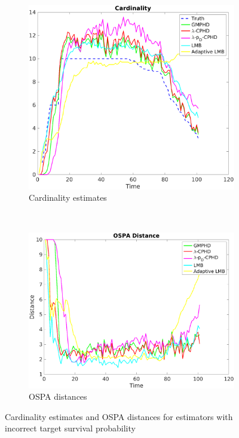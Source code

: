 \documentclass{article}
\begin{document}
\begin{figure}[H]
  \centering
  \begin{subfigure}[t]{0.49\textwidth}
    \centering
    \includegraphics[width=1\linewidth]{high_ps/cardinality.png}
    \caption{Cardinality estimates}
  \end{subfigure}%
  ~ 
  \begin{subfigure}[t]{0.49\textwidth}
    \centering
    \includegraphics[width=1\linewidth]{high_ps/ospa.png}
    \caption{OSPA distances}
  \end{subfigure}
\caption{Cardinality estimates and OSPA distances for estimators with incorrect target survival probability}
\end{figure}
\end{document}
